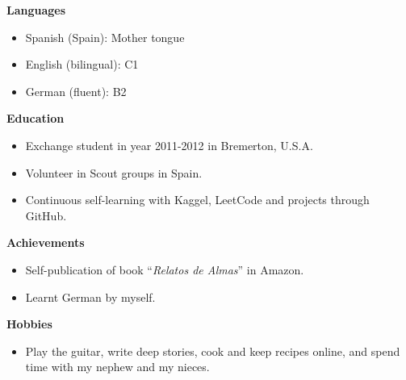 \documentclass[10pt,a4paper]{article}
\begin{document}
\textbf{Languages}
\begin{itemize}
  \item Spanish (Spain): Mother tongue
  \item English (bilingual): C1
  \item German (fluent): B2
\end{itemize}

\textbf{Education}
\begin{itemize}
  \item Exchange student in year 2011-2012 in Bremerton, U.S.A.
  \item Volunteer in Scout groups in Spain.
  \item Continuous self-learning with Kaggel, LeetCode and projects through GitHub.
\end{itemize}

\textbf{Achievements}
\begin{itemize}
  \item Self-publication of book ``\textit{Relatos de Almas}'' in Amazon.
  \item Learnt German by myself.
\end{itemize}

\textbf{Hobbies}
\begin{itemize}
  \item Play the guitar, write deep stories, cook and keep recipes online, and spend time with my nephew and my nieces.
\end{itemize}
\end{document}
